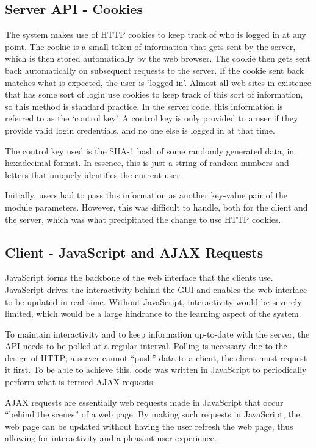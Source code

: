 \subsection{Server API - Cookies}\label{Cookies}

The system makes use of HTTP cookies to keep track of who is logged in at any point. The cookie is a small token of information that gets sent by the server, which is then stored automatically by the web browser. The cookie then gets sent back automatically on subsequent requests to the server. If the cookie sent back matches what is expected, the user is `logged in'. Almost all web sites in existence that has some sort of login use cookies to keep track of this sort of information, so this method is standard practice. 
In the server code, this information is referred to as the `control key'. A control key is only provided to a user if they provide valid login credentials, and no one else is logged in at that time. 

The control key used is the SHA-1 hash of some randomly generated data, in hexadecimal format. In essence, this is just a string of random numbers and letters that uniquely identifies the current user.

Initially, users had to pass this information as another key-value pair of the module parameters. However, this was difficult to handle, both for the client and the server, which was what precipitated the change to use HTTP cookies.

\subsection{Client - JavaScript and AJAX Requests}

JavaScript forms the backbone of the web interface that the clients use. JavaScript drives the interactivity behind the GUI and enables the web interface to be updated in real-time. Without JavaScript, interactivity would be severely limited, which would be a large hindrance to the learning aspect of the system. 

To maintain interactivity and to keep information up-to-date with the server, the API needs to be polled at a regular interval. Polling is necessary due to the design of HTTP; a server cannot ``push'' data to a client, the client must request it first. To be able to achieve this, code was written in JavaScript to periodically perform what is termed AJAX requests. 

AJAX requests are essentially web requests made in JavaScript that occur ``behind the scenes'' of a web page. By making such requests in JavaScript, the web page can be updated without having the user refresh the web page, thus allowing for interactivity and a pleasant user experience.

